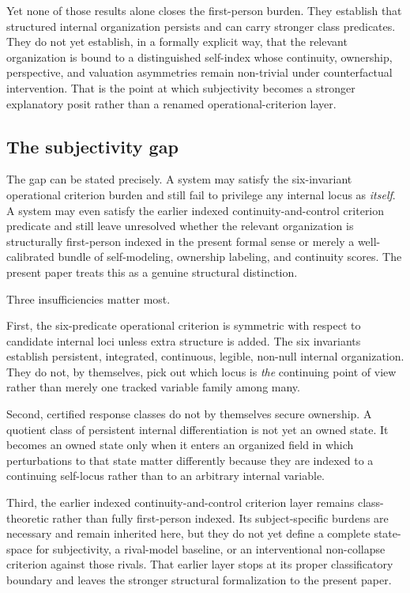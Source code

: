 \documentclass[11pt,a4paper]{article}
\theoremstyle{definition}
\begin{document}
Yet none of those results alone closes the first-person burden. They establish that structured internal organization persists and can carry stronger class predicates. They do not yet establish, in a formally explicit way, that the relevant organization is bound to a distinguished self-index whose continuity, ownership, perspective, and valuation asymmetries remain non-trivial under counterfactual intervention. That is the point at which subjectivity becomes a stronger explanatory posit rather than a renamed operational-criterion layer.

\subsection{The subjectivity gap}
The gap can be stated precisely. A system may satisfy the six-invariant operational criterion burden and still fail to privilege any internal locus as \emph{itself}. A system may even satisfy the earlier indexed continuity-and-control criterion predicate and still leave unresolved whether the relevant organization is structurally first-person indexed in the present formal sense or merely a well-calibrated bundle of self-modeling, ownership labeling, and continuity scores. The present paper treats this as a genuine structural distinction.

Three insufficiencies matter most.

First, the six-predicate operational criterion is symmetric with respect to candidate internal loci unless extra structure is added. The six invariants establish persistent, integrated, continuous, legible, non-null internal organization. They do not, by themselves, pick out which locus is \emph{the} continuing point of view rather than merely one tracked variable family among many.

Second, certified response classes do not by themselves secure ownership. A quotient class of persistent internal differentiation is not yet an owned state. It becomes an owned state only when it enters an organized field in which perturbations to that state matter differently because they are indexed to a continuing self-locus rather than to an arbitrary internal variable.

Third, the earlier indexed continuity-and-control criterion layer remains class-theoretic rather than fully first-person indexed. Its subject-specific burdens are necessary and remain inherited here, but they do not yet define a complete state-space for subjectivity, a rival-model baseline, or an interventional non-collapse criterion against those rivals. That earlier layer stops at its proper classificatory boundary and leaves the stronger structural formalization to the present paper.
\end{document}
